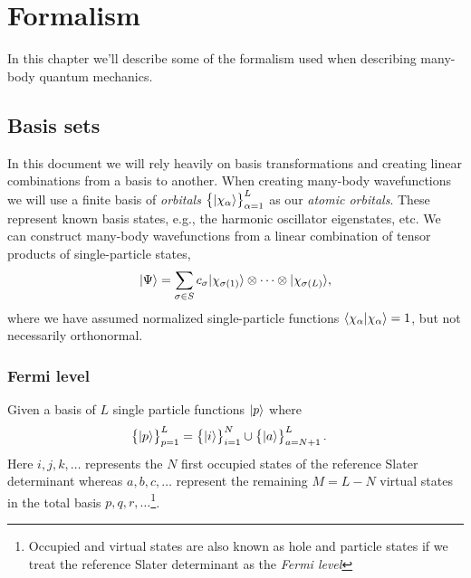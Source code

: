 \chapter{Formalism}
    In this chapter we'll describe some of the formalism used when describing
    many-body quantum mechanics.

    \section{Basis sets}
        In this document we will rely heavily on basis transformations and
        creating linear combinations from a basis to another. When creating
        many-body wavefunctions we will use a finite basis of \emph{orbitals}
        $\left\{ | \chi_{\alpha} \rangle \right\}_{\alpha = 1}^{L}$ as our \emph{atomic
        orbitals}. These represent known basis states, e.g., the harmonic
        oscillator eigenstates, etc. We can construct many-body wavefunctions
        from a linear combination of tensor products of single-particle states,
        \begin{align}
            | \Psi \rangle
            = \sum_{\sigma \in S} c_{\sigma}
            | \chi_{\sigma(1)} \rangle\otimes\dots\otimes| \chi_{\sigma(L)} \rangle,
        \end{align}
        where we have assumed normalized single-particle functions
        $\langle \chi_{\alpha} | \chi_{\alpha} \rangle = 1$, but not necessarily
        orthonormal.

        \subsection{Fermi level}
            Given a basis of $L$ single particle functions $| p \rangle$ where
            \begin{align}
                \left\{| p \rangle\right\}_{p = 1}^{L}
                &=
                \left\{| i \rangle\right\}_{i = 1}^{N}
                \cup \left\{| a \rangle\right\}_{a = N + 1}^{L}.
            \end{align}
            Here $i, j, k, \dots$ represents the $N$ first occupied states of
            the reference Slater determinant whereas $a, b, c, \dots$ represent
            the remaining $M = L - N$ virtual states in the total basis $p, q,
            r, \dots$\footnote{Occupied and virtual states are also known as
            hole and particle states if we treat the reference Slater
            determinant as the \textit{Fermi level}}.

